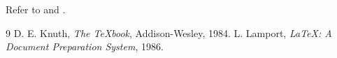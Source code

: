 \documentclass{article}
\begin{document}
Refer to \cite{knuth} and \cite{lamport}.
\begin{thebibliography}{9}
 D. E. Knuth, \emph{The TeXbook}, Addison-Wesley, 1984.
 L. Lamport, \emph{LaTeX: A Document Preparation System}, 1986.
\end{thebibliography}
\end{document}
